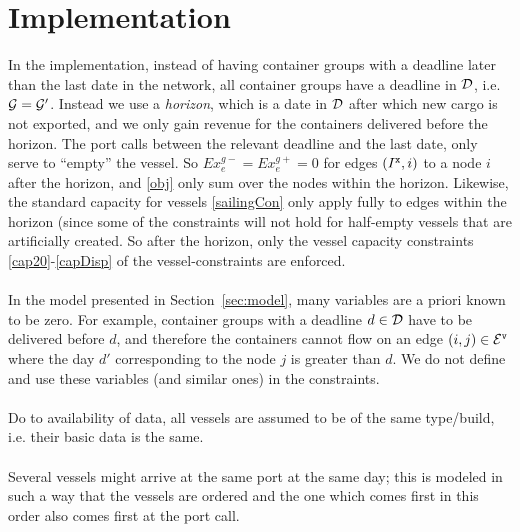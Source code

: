 \section{Implementation}
In the implementation, instead of having container groups with a deadline later than the last date in the network, all container groups have a deadline in $\mathcal{D}$, i.e. $\mathcal{G} = \mathcal{G}'$. Instead we use a \emph{horizon}, which is a date in $\mathcal{D}$ after which new cargo is not exported, and we only gain revenue for the containers delivered before the horizon. 
The port calls between the relevant deadline %
and the last date, only serve to ``empty'' the vessel.
So $Ex^{g-}_e = Ex^{g+}_e = 0$ for edges $(I^\texttt{x},i)$ to a node $i$ after the horizon, and \eqref{obj} only sum over the nodes within the horizon. 
Likewise, the standard capacity for vessels \eqref{sailingCon} only apply fully to edges within the horizon (since some of the constraints will not hold for half-empty vessels that are artificially created. So after the horizon, only the vessel capacity constraints \eqref{cap20}-\eqref{capDisp} of the vessel-constraints are enforced. %
\\\\
In the model presented in Section~\ref{sec:model}, many variables are a priori known to be zero. For example, container groups with a deadline $d\in\mathcal{D}$ have to be delivered before $d$, and therefore the containers cannot flow on an edge $(i,j)\in\mathcal{E}^\texttt{v}$ where the day $d'$ corresponding to the node $j$ is greater than $d$. We do not define and use these variables (and similar ones) in the constraints.
\\\\
Do to availability of data, all vessels are assumed to be of the same type/build, i.e. their basic data is the same.
\\\\
Several vessels might arrive at the same port at the same day; this is modeled in such a way that the vessels are ordered and the one which comes first in this order also comes first at the port call. 
